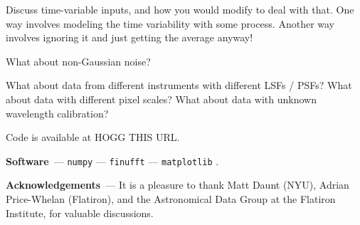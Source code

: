 \documentclass[11pt]{article}
\renewcommand{\paragraph}[1]{\medskip\par\noindent\textbf{#1}~---}
\begin{document}
Discuss time-variable inputs, and how you would modify to deal with that.
One way involves modeling the time variability with some process.
Another way involves ignoring it and just getting the average anyway!

What about non-Gaussian noise?

What about data from different instruments with different LSFs / PSFs? What about data with different pixel scales? What about data with unknown wavelength calibration?

Code is available at HOGG THIS URL.

\paragraph{Software}
\texttt{numpy} \cite{numpy} ---
\texttt{finufft} \cite{finufft} ---
\texttt{matplotlib} \cite{matplotlib}.

\paragraph{Acknowledgements}
It is a pleasure to thank
Matt Daunt (NYU),
Adrian Price-Whelan (Flatiron),
and the Astronomical Data Group at the Flatiron Institute,
for valuable discussions.
\end{document}
